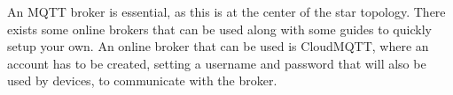 An MQTT broker is essential, as this is at the center of the star topology. There exists some online brokers that can be used along with some guides to quickly setup your own. An online broker that can be used is CloudMQTT, where an account has to be created, setting a username and password that will also be used by devices, to communicate with the broker. 

